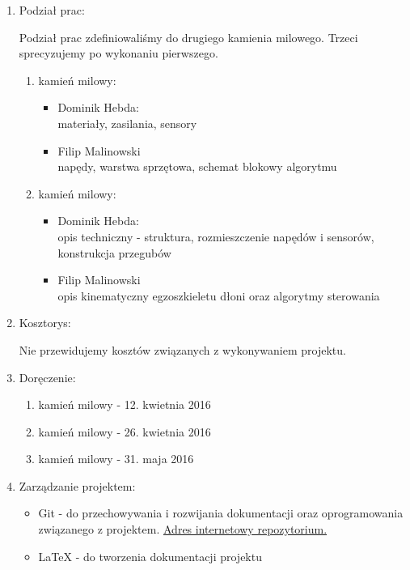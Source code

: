 \documentclass[a4paper]{article}
\begin{document}
\begin{enumerate}
\newpage

\item Podział prac:

Podział prac zdefiniowaliśmy do drugiego kamienia milowego. Trzeci sprecyzujemy po wykonaniu pierwszego.
\begin{enumerate}[I]
\item kamień milowy:
\begin{itemize}
\item Dominik Hebda: \\
materiały, zasilania, sensory
\item Filip Malinowski \\
napędy, warstwa sprzętowa, schemat blokowy algorytmu
\end{itemize}
\item kamień milowy:
\begin{itemize}
\item Dominik Hebda: \\
opis techniczny - struktura, rozmieszczenie napędów i sensorów, konstrukcja przegubów
\item Filip Malinowski \\
opis kinematyczny egzoszkieletu dłoni oraz algorytmy sterowania
\end{itemize}
\end{enumerate}

\item Kosztorys:

Nie przewidujemy kosztów związanych z wykonywaniem projektu.

\item Doręczenie:
\begin{enumerate}[I]
\item kamień milowy - 12. kwietnia 2016
\item kamień milowy - 26. kwietnia 2016
\item kamień milowy - 31. maja 2016
\end{enumerate}

\item Zarządzanie projektem:
\begin{itemize}
\item Git - do przechowywania i rozwijania dokumentacji oraz oprogramowania związanego z projektem.
\href{https://github.com/hizonglol/roboty_mobilne-2016}{Adres internetowy repozytorium.}
\item LaTeX - do tworzenia dokumentacji projektu
\end{itemize}
\end{enumerate}
\end{document}
